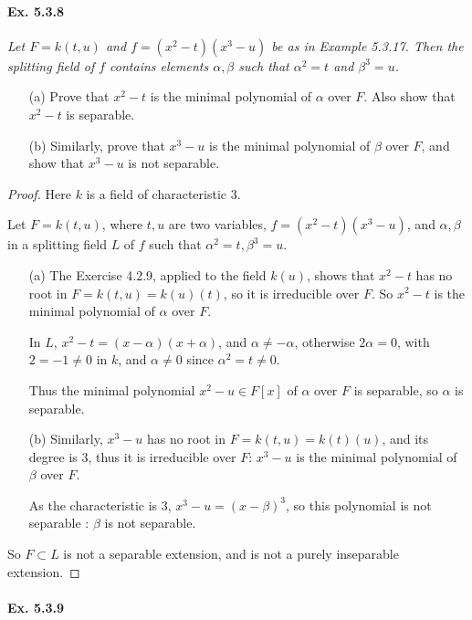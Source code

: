 \documentclass[11pt,a4paper]{article}
\begin{document}
\paragraph{Ex. 5.3.8}

{\it Let $F = k(t,u)$ and $f = (x^2 - t)(x^3 -u)$ be as in Example 5.3.17. Then the splitting field of $f$ contains elements $\alpha,\beta$ such that $\alpha^2 = t$ and $\beta^3 = u$.
\begin{enumerate}
\item[(a)] Prove that $x^2 -t$ is the minimal polynomial of $\alpha$ over $F$. Also show that $x^2 -t$ is separable.
\item[(b)] Similarly, prove that $x^3 -u$ is the minimal polynomial of $\beta$ over $F$, and show that $x^3 - u$ is not separable.
\end{enumerate}
}

\begin{proof}
Here $k$ is a field of characteristic 3.

Let $F = k(t,u)$, where $t,u$ are two variables,  $f = (x^2-t)(x^3-u)$, and $\alpha, \beta$ in a splitting field  $L$ of $f$ such that $\alpha^2 =t, \beta^3=u$.

\begin{enumerate}
\item[(a)]
The Exercise 4.2.9, applied to the field $k(u)$,  shows that $x^2-t$  has no root in $F  = k(t,u) = k(u) (t)$, so it is irreducible over $F$. So $x^2 -t$ is the minimal polynomial of $\alpha$ over $F$. 

In $L$, $x^2 - t = (x-\alpha)(x+\alpha)$, and $\alpha \neq -\alpha$, otherwise $2 \alpha = 0$, with $2=-1\neq 0$ in $k$, and $\alpha \neq 0$ since $\alpha^2 = t \ne 0$.

Thus the minimal polynomial $x^2 - u \in F[x]$ of $\alpha$ over $F$ is separable, so $\alpha$ is separable.

\item[(b)]
Similarly, $x^3 - u$ has no root in $F=k(t,u) = k(t)(u)$, and its degree is 3, thus it is irreducible over $F$: $x^3-u$ is the minimal polynomial of $\beta$ over $F$.

As the characteristic is 3, $x^3 - u = (x-\beta)^3$, so this polynomial is not separable : $\beta$ is not separable.

\end{enumerate}
So $F\subset L$ is not a separable extension, and is not a purely inseparable extension.
\end{proof}

\paragraph{Ex. 5.3.9}
\end{document}
